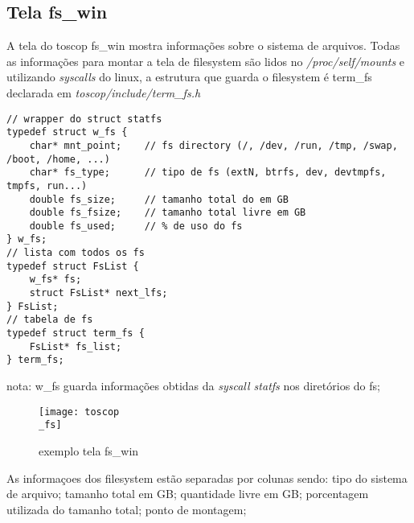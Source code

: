 \documentclass{article}
\begin{document}
\subsection{Tela fs\_win}
A tela do toscop fs\_win mostra informações sobre o sistema de arquivos. Todas
as informações para montar a tela de filesystem são lidos no \textit{/proc/self/mounts}
e utilizando \textit{syscalls} do linux, a estrutura que guarda o filesystem é
term\_fs declarada em \textit{toscop/include/term\_fs.h}
\begin{verbatim}
// wrapper do struct statfs
typedef struct w_fs { 
    char* mnt_point;    // fs directory (/, /dev, /run, /tmp, /swap, /boot, /home, ...)
    char* fs_type;      // tipo de fs (extN, btrfs, dev, devtmpfs, tmpfs, run...)
    double fs_size;     // tamanho total do em GB
    double fs_fsize;    // tamanho total livre em GB
    double fs_used;     // % de uso do fs 
} w_fs;
// lista com todos os fs
typedef struct FsList {
    w_fs* fs;
    struct FsList* next_lfs;
} FsList;
// tabela de fs
typedef struct term_fs {
    FsList* fs_list;
} term_fs;
\end{verbatim}
nota: w\_fs guarda informações obtidas da \textit{syscall statfs} nos diretórios do fs;

\begin{figure}[H]
    \centering
    \texttt{[image: toscop\\\_fs]}
    \caption{exemplo tela fs\_win}
\end{figure}
As informaçoes dos filesystem estão separadas por colunas sendo:
tipo do sistema de arquivo; tamanho total em GB; quantidade livre em GB;
porcentagem utilizada do tamanho total; ponto de montagem;
\end{document}
